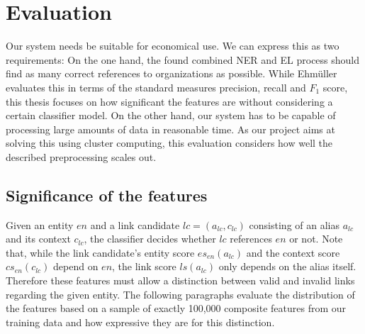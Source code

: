 \section{Evaluation}
\label{sec:evaluation}
Our system needs be suitable for economical use. We can express this as two requirements: On the one hand, the found combined NER and EL process should find as many correct references to organizations as possible. While Ehmüller~\cite{ehmueller} evaluates this in terms of the standard measures precision, recall and $F_1$ score, this thesis focuses on how significant the features are without considering a certain classifier model. On the other hand, our system has to be capable of processing large amounts of data in reasonable time. As our project aims at solving this using cluster computing, this evaluation considers how well the described preprocessing scales out.



\subsection{Significance of the features}
Given an entity $en$ and a link candidate $lc=(a_{lc}, c_{lc})$ consisting of an alias $a_{lc}$ and its context $c_{lc}$, the classifier decides whether $lc$ references $en$ or not. Note that, while the link candidate's entity score $es_{en}(a_{lc})$ and the context score $cs_{en}(c_{lc})$ depend on $en$, the link score $ls(a_{lc})$ only depends on the alias itself. Therefore these features must allow a distinction between valid and invalid links regarding the given entity. The following paragraphs evaluate the distribution of the features based on a sample of exactly 100,000 composite features from our training data and how expressive they are for this distinction.

